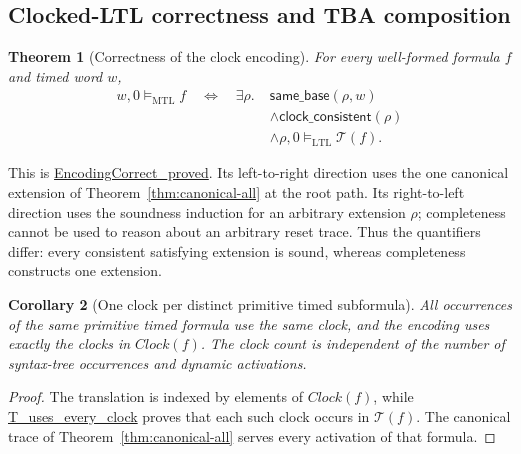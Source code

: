 \documentclass{ieeeaccess}
\newtheorem{theorem}{Theorem}[section]
\newtheorem{corollary}[theorem]{Corollary}
\newcommand{\satM}{\models_{\mathrm{MTL}}}
\newcommand{\satL}{\models_{\mathrm{LTL}}}
\newcommand{\T}{\mathcal{T}}
\newcommand{\Clock}{\mathit{Clock}}
\newcommand{\Rocqid}[1]{\url{#1}}
\begin{document}
\subsection{Clocked-LTL correctness and TBA composition}
\begin{theorem}[Correctness of the clock encoding]
\label{thm:encoding-correctness}
For every well-formed formula $f$ and timed word $w$,
\begin{align*}
w,0\satM f\quad\Longleftrightarrow\quad
\exists\rho.\;&\mathsf{same\_base}(\rho,w)\\[-1mm]
&\land\mathsf{clock\_consistent}(\rho)\\[-1mm]
&\land\rho,0\satL\T(f).
\end{align*}
\end{theorem}
This is \Rocqid{EncodingCorrect_proved}. Its left-to-right direction uses
the one canonical extension of Theorem~\ref{thm:canonical-all} at the root
path. Its right-to-left direction uses the soundness induction for an
arbitrary extension $\rho$; completeness cannot be used to reason about an
arbitrary reset trace. Thus the quantifiers differ: every consistent
satisfying extension is sound, whereas completeness constructs one extension.

\begin{corollary}[One clock per distinct primitive timed subformula]
\label{cor:one-clock-formula}
All occurrences of the same primitive timed formula use the same clock, and
the encoding uses exactly the clocks in $\Clock(f)$. The clock count is
independent of the number of syntax-tree occurrences and dynamic activations.
\end{corollary}
\begin{proof}
The translation is indexed by elements of $\Clock(f)$, while
\Rocqid{T_uses_every_clock} proves that each such clock occurs in $\T(f)$.
The canonical trace of Theorem~\ref{thm:canonical-all} serves every activation
of that formula.
\end{proof}
\end{document}
